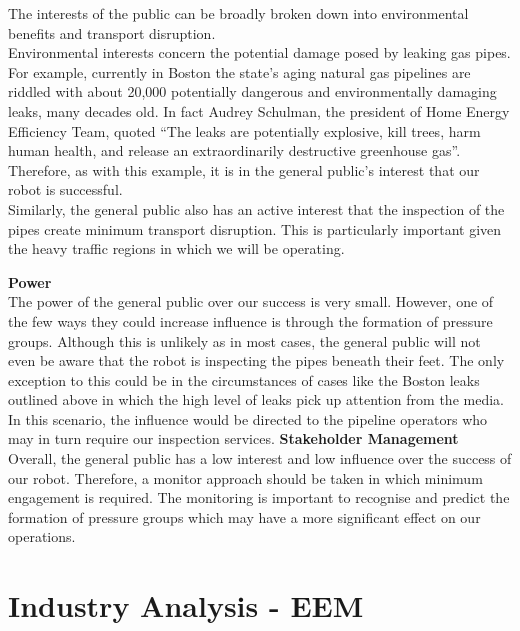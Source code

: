 \documentclass[11pt]{article}		%
\begin{document}
	        The interests of the public can be broadly broken down into environmental benefits and transport disruption.\\
		    \hspace*{3ex}Environmental interests concern the potential damage posed by leaking gas pipes. For example, currently in Boston the state’s aging natural gas pipelines are riddled with about 20,000 potentially dangerous and environmentally damaging leaks, many decades old. In fact Audrey Schulman, the president of Home Energy Efficiency Team, quoted  “The leaks are potentially explosive, kill trees, harm human health, and release an extraordinarily destructive greenhouse gas”. Therefore, as with this example, it is in the general public's interest that our robot is successful. \\
	        \hspace*{3ex}Similarly, the general public also has an active interest that the inspection of the pipes create minimum transport disruption. This is particularly important given the heavy traffic regions in which we will be operating. 
	        
	        \textbf{Power}\\
	        The power of the general public over our success is very small. However, one of the few ways they could increase influence is through the formation of pressure groups. Although this is unlikely as in most cases, the general public will not even be aware that the robot is inspecting the pipes beneath their feet. The only exception to this could be in the circumstances of cases like the Boston leaks outlined above in which the high level of leaks pick up attention from the media. In this scenario, the influence would be directed to the pipeline operators who may in turn require our inspection services.
	        \textbf{Stakeholder Management}\\
	        
	        Overall, the general public has a low interest and low influence over the success of our robot. Therefore, a monitor approach should be taken in which minimum engagement is required. The monitoring is important to recognise and predict the formation of pressure groups which may have a more significant effect on our operations. 
        
	\section{Industry Analysis - EEM}
		
\end{document}
